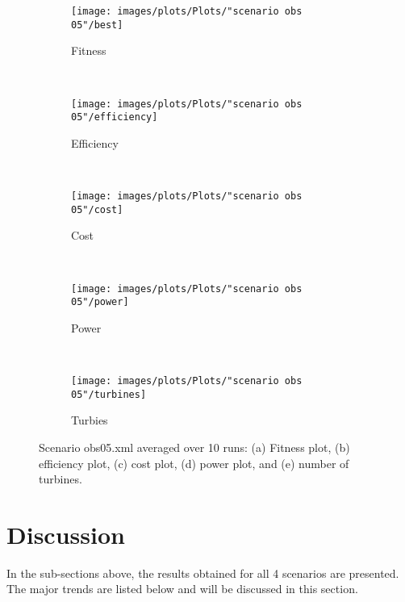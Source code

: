 \begin{figure}[h!]
    \centering
      \begin{subfigure}[b]{0.31\textwidth}
        \texttt{[image: images/plots/Plots/"scenario obs 05"/best]}
        \caption{Fitness}
        \hfill
        \label{plot:fitness plot scenario obs 05}
    \end{subfigure}
    ~
      \begin{subfigure}[b]{0.31\textwidth}
        \texttt{[image: images/plots/Plots/"scenario obs 05"/efficiency]}
        \caption{Efficiency}
        \hfill
        \label{plot:efficiency plot scenario obs 05}
    \end{subfigure}
    ~
    \begin{subfigure}[b]{0.31\textwidth}
        \texttt{[image: images/plots/Plots/"scenario obs 05"/cost]}
        \caption{Cost}
        \hfill
        \label{plot:cost plot scenario obs 05}
    \end{subfigure}
    ~
    \begin{subfigure}[b]{0.31\textwidth}
        \texttt{[image: images/plots/Plots/"scenario obs 05"/power]}
        \caption{Power}
        \hfill
        \label{plot:power plot scenario obs 05}
    \end{subfigure}
    ~
    \begin{subfigure}[b]{0.31\textwidth}
        \texttt{[image: images/plots/Plots/"scenario obs 05"/turbines]}
        \caption{Turbies}
        \hfill
        \label{plot:turbines plot scenario obs 05}
    \end{subfigure}
    \caption{Scenario obs05.xml averaged over 10 runs: (a) Fitness plot, (b) efficiency plot, (c) cost plot, (d) power plot, and (e) number of turbines.}
    \label{plot:scenario obs 05}
\end{figure}


\section{Discussion}\label{section:discussion}
\noindent In the sub-sections above, the results obtained for all 4 scenarios are presented. The major trends are listed below and will be discussed in this section.\\


